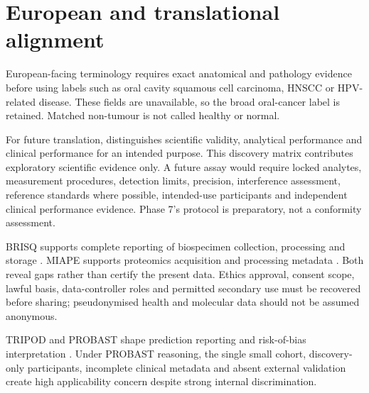 \chapter{European and translational alignment}
\label{chap:european_and_translational_alignment}

European-facing terminology requires exact anatomical and pathology evidence before using labels such as oral cavity squamous cell carcinoma, HNSCC or HPV-related disease. These fields are unavailable, so the broad oral-cancer label is retained. Matched non-tumour is not called healthy or normal.

For future translation, \textcite{eu2017ivdr} distinguishes scientific validity, analytical performance and clinical performance for an intended purpose. This discovery matrix contributes exploratory scientific evidence only. A future assay would require locked analytes, measurement procedures, detection limits, precision, interference assessment, reference standards where possible, intended-use participants and independent clinical performance evidence. Phase 7's protocol is preparatory, not a conformity assessment.

BRISQ supports complete reporting of biospecimen collection, processing and storage \parencite{moore2011}. MIAPE supports proteomics acquisition and processing metadata \parencite{taylor2007}. Both reveal gaps rather than certify the present data. Ethics approval, consent scope, lawful basis, data-controller roles and permitted secondary use must be recovered before sharing; pseudonymised health and molecular data should not be assumed anonymous.

TRIPOD and PROBAST shape prediction reporting and risk-of-bias interpretation \parencite{collins2015,wolff2019}. Under PROBAST reasoning, the single small cohort, discovery-only participants, incomplete clinical metadata and absent external validation create high applicability concern despite strong internal discrimination.
